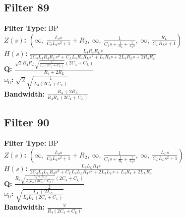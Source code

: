 \documentclass{article}
\begin{document}
\subsection*{Filter 89}
\textbf{Filter Type:} BP \\ 
\textbf{$Z(s)$:} $\left( \infty, \  \frac{L_{2} s}{C_{2} L_{2} s^{2} + 1} + R_{2}, \  \infty, \  \frac{1}{C_{4} s + \frac{1}{R_{4}} + \frac{1}{L_{4} s}}, \  \infty, \  \frac{R_{L}}{C_{L} R_{L} s + 1}\right)$ \\ 
\textbf{$H(s)$:} $\frac{L_{4} R_{4} R_{L} s}{2 C_{4} L_{4} R_{4} R_{L} s^{2} + C_{L} L_{4} R_{4} R_{L} s^{2} + L_{4} R_{4} s + 2 L_{4} R_{L} s + 2 R_{4} R_{L}}$ \\ 
\textbf{Q:} $\frac{\sqrt{2} R_{4} R_{L} \sqrt{\frac{1}{L_{4} \left(2 C_{4} + C_{L}\right)}} \left(2 C_{4} + C_{L}\right)}{R_{4} + 2 R_{L}}$ \\ 
\textbf{$\omega_0$:} $\sqrt{2} \sqrt{\frac{1}{L_{4} \left(2 C_{4} + C_{L}\right)}}$ \\ 
\textbf{Bandwidth:} $\frac{R_{4} + 2 R_{L}}{R_{4} R_{L} \left(2 C_{4} + C_{L}\right)}$ \\ 
\subsection*{Filter 90}
\textbf{Filter Type:} BP \\ 
\textbf{$Z(s)$:} $\left( \infty, \  \frac{L_{2} s}{C_{2} L_{2} s^{2} + 1} + R_{2}, \  \infty, \  \frac{1}{C_{4} s + \frac{1}{R_{4}} + \frac{1}{L_{4} s}}, \  \infty, \  \frac{L_{L} s}{C_{L} L_{L} s^{2} + 1}\right)$ \\ 
\textbf{$H(s)$:} $\frac{L_{4} L_{L} R_{4} s}{2 C_{4} L_{4} L_{L} R_{4} s^{2} + C_{L} L_{4} L_{L} R_{4} s^{2} + 2 L_{4} L_{L} s + L_{4} R_{4} + 2 L_{L} R_{4}}$ \\ 
\textbf{Q:} $\frac{R_{4} \sqrt{\frac{L_{4} + 2 L_{L}}{L_{4} L_{L} \left(2 C_{4} + C_{L}\right)}} \left(2 C_{4} + C_{L}\right)}{2}$ \\ 
\textbf{$\omega_0$:} $\sqrt{\frac{L_{4} + 2 L_{L}}{L_{4} L_{L} \left(2 C_{4} + C_{L}\right)}}$ \\ 
\textbf{Bandwidth:} $\frac{2}{R_{4} \left(2 C_{4} + C_{L}\right)}$ \\ 
\end{document}
